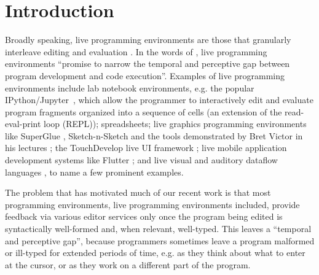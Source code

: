 \newcommand{\introSec}{Introduction}
\section{\protect\introSec}
\label{sec:intro}

Broadly speaking, live programming environments are those that granularly interleave editing and evaluation \cite{DBLP:conf/icse/Tanimoto13,DBLP:journals/vlc/Tanimoto90,McDirmid:2007:LUL:1297027.1297073,burckhardt2013s}. 
In the words of \citet{burckhardt2013s}, live programming environments 
``promise to narrow the temporal and perceptive gap 
between program development and code execution''. Examples of live programming environments include {lab notebook environments},
e.g. the popular IPython/Jupyter~\cite{PER-GRA:2007}, which allow the
programmer to interactively edit and evaluate program fragments organized into a
sequence of cells (an extension of the read-eval-print loop (REPL)); spreadsheets; {live graphics programming environments} like SuperGlue \cite{McDirmid:2007:LUL:1297027.1297073}, Sketch-n-Sketch \cite{DBLP:conf/pldi/ChughHSA16} and the tools demonstrated by Bret Victor in his lectures \cite{victor2012inventing}; the TouchDevelop live UI framework \cite{burckhardt2013s}; live mobile application development systems like Flutter \cite{flutter}; and live visual and auditory dataflow languages \cite{DBLP:conf/vl/BurnettAW98}, to name a few prominent examples.


The problem that has motivated much of our recent work is that most  
programming environments, live programming environments included,  provide feedback via various editor services only once the program being edited is syntactically well-formed and, when relevant, well-typed. This leaves a ``temporal and perceptive gap'', because programmers sometimes leave a program malformed or ill-typed for extended periods of time, e.g. as they think about what to enter at the cursor, or as they work on a different part of the program.

